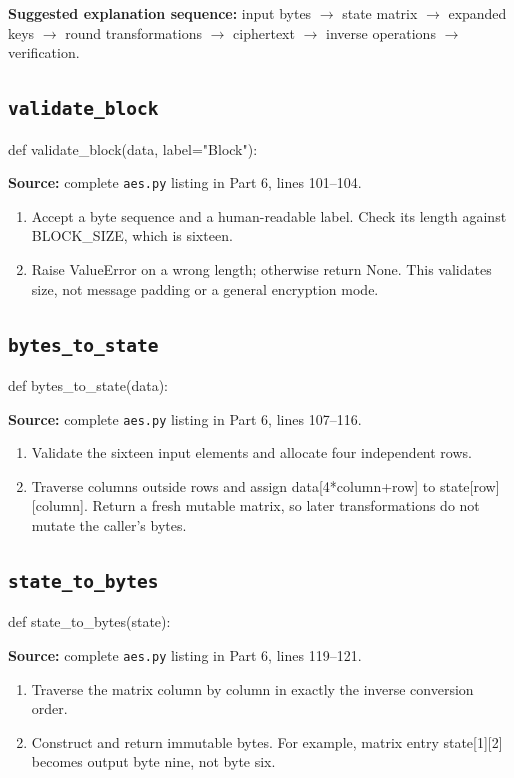 \noindent\textbf{Suggested explanation sequence:} input bytes $\rightarrow$ state matrix $\rightarrow$ expanded keys $\rightarrow$ round transformations $\rightarrow$ ciphertext $\rightarrow$ inverse operations $\rightarrow$ verification.

\subsection{\texttt{validate\_\allowbreak{}block}}
\begin{lightcode}
def validate_block(data, label="Block"):
\end{lightcode}
\noindent\textbf{Source:} complete \texttt{aes.py} listing in Part 6, lines 101--104.
\begin{enumerate}
\item Accept a byte sequence and a human-readable label. Check its length against BLOCK\_SIZE, which is sixteen.
\item Raise ValueError on a wrong length; otherwise return None. This validates size, not message padding or a general encryption mode.
\end{enumerate}
\subsection{\texttt{bytes\_\allowbreak{}to\_\allowbreak{}state}}
\begin{lightcode}
def bytes_to_state(data):
\end{lightcode}
\noindent\textbf{Source:} complete \texttt{aes.py} listing in Part 6, lines 107--116.
\begin{enumerate}
\item Validate the sixteen input elements and allocate four independent rows.
\item Traverse columns outside rows and assign data[4*column+row] to state[row][column]. Return a fresh mutable matrix, so later transformations do not mutate the caller's bytes.
\end{enumerate}
\subsection{\texttt{state\_\allowbreak{}to\_\allowbreak{}bytes}}
\begin{lightcode}
def state_to_bytes(state):
\end{lightcode}
\noindent\textbf{Source:} complete \texttt{aes.py} listing in Part 6, lines 119--121.
\begin{enumerate}
\item Traverse the matrix column by column in exactly the inverse conversion order.
\item Construct and return immutable bytes. For example, matrix entry state[1][2] becomes output byte nine, not byte six.
\end{enumerate}
